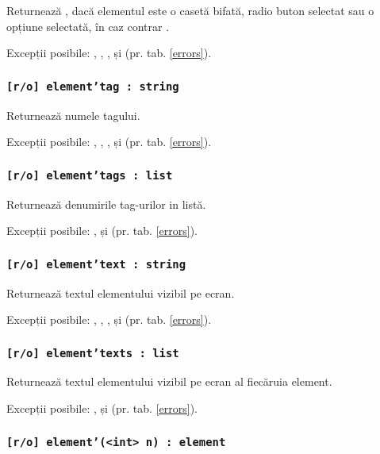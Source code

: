 Returnează \true, dacă elementul este o casetă bifată, radio buton selectat sau o opțiune selectată, în caz contrar \false.

Excepții posibile: , , ,  și  (pr. tab. \ref{errors}).

\subsubsection{\texttt{[r/o] element'tag : string}}

Returnează numele tagului.

Excepții posibile: , , ,  și  (pr. tab. \ref{errors}).

\subsubsection{\texttt{[r/o] element'tags : list}}

Returnează denumirile tag-urilor in listă.

Excepții posibile: ,  și  (pr. tab. \ref{errors}).

\subsubsection{\texttt{[r/o] element'text : string}}

Returnează textul elementului vizibil pe ecran. 

Excepții posibile: , , ,  și  (pr. tab. \ref{errors}).

\subsubsection{\texttt{[r/o] element'texts : list}}

Returnează textul elementului vizibil pe ecran al fiecăruia element.

Excepții posibile: ,  și  (pr. tab. \ref{errors}).

\subsubsection{\texttt{[r/o] element'(<int> n) : element}}

